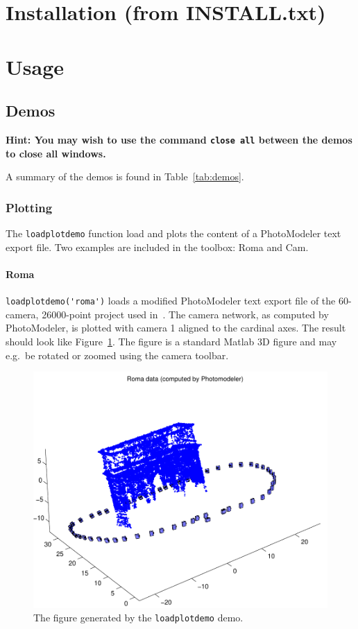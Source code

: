 \documentclass{article}
\begin{document}
\newpage
\section[Installation]{Installation (from INSTALL.txt)}
\label{sec:install}
\label{step:dbatInit}

{\footnotesize

}

\newpage
\section{Usage}

\subsection{Demos}
\label{sec:demos}

\textbf{Hint: You may wish to use the command \texttt{close all}
  between the demos to close all windows.}

A summary of the demos is found in Table~\ref{tab:demos}.

\subsubsection{Plotting}
\label{sec:loadplotdemo}
\label{sec:loadroma}

The \verb+loadplotdemo+ function load and plots the content of a
PhotoModeler text export file. Two examples are included in the
toolbox: {\sc Roma} and {\sc Cam}.

\paragraph{\sc Roma}
\verb+loadplotdemo('roma')+ loads a modified PhotoModeler text export
file of the 60-camera, 26000-point project used
in~\citet{Borlin2013:Bundle}. The camera network, as computed by
PhotoModeler, is plotted with camera 1 aligned to the cardinal axes.
The result should look like Figure~\ref{fig:roma}. The figure is a
standard Matlab 3D figure and may e.g.\ be rotated or zoomed using the
camera toolbar.

\begin{figure}
  \centering
  \includegraphics[width=0.5\hsize]{ill/roma}
  \caption{The figure generated by the \texttt{loadplotdemo} demo.}
  \label{fig:roma}
\end{figure}
\end{document}

